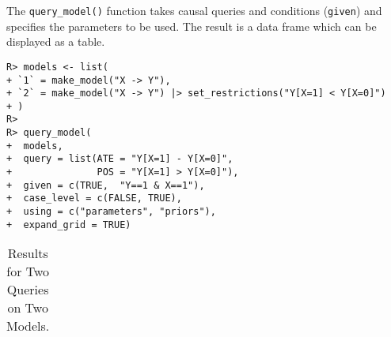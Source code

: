 \documentclass[
  11pt,
  article]{jss}
\begin{document}
The \texttt{query\_model()} function takes causal queries and conditions
(\texttt{given}) and specifies the parameters to be used. The result is
a data frame which can be displayed as a table.

\begin{verbatim}
R> models <- list(
+ `1` = make_model("X -> Y"),
+ `2` = make_model("X -> Y") |> set_restrictions("Y[X=1] < Y[X=0]")
+ )
R> 
R> query_model(
+  models,
+  query = list(ATE = "Y[X=1] - Y[X=0]", 
+               POS = "Y[X=1] > Y[X=0]"),
+  given = c(TRUE,  "Y==1 & X==1"),
+  case_level = c(FALSE, TRUE),
+  using = c("parameters", "priors"),
+  expand_grid = TRUE)
\end{verbatim}

\hypertarget{tbl-batch-query}{}
\begin{longtable}{ccccccc}
\caption{\label{tbl-batch-query}Results for Two Queries on Two Models. }\tabularnewline


\end{longtable}
\end{document}
